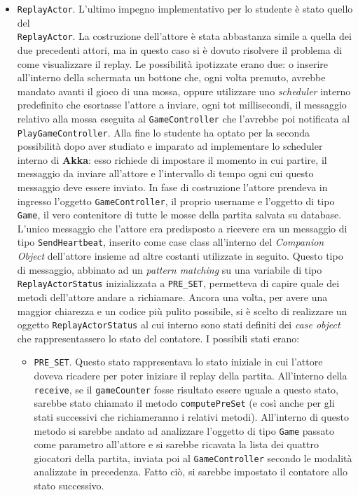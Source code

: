 \begin{itemize}
     \item \texttt{ReplayActor}.
     L'ultimo impegno implementativo per lo studente è stato quello del \\ \texttt{ReplayActor}. La costruzione dell'attore è stata abbastanza simile a quella dei due precedenti attori, ma in questo caso si è dovuto risolvere il problema di come visualizzare il replay. Le possibilità ipotizzate erano due: o inserire all'interno della schermata un bottone che, ogni volta premuto, avrebbe mandato avanti il gioco di una mossa, oppure utilizzare uno \textit{scheduler} interno predefinito che esortasse l'attore a inviare, ogni tot millisecondi, il messaggio relativo alla mossa eseguita al \texttt{GameController} che l'avrebbe poi notificata al \texttt{PlayGameController}. Alla fine lo studente ha optato per la seconda possibilità dopo aver studiato e imparato ad implementare lo scheduler interno di \textbf{Akka}: esso richiede di impostare il momento in cui partire, il messaggio da inviare all'attore e l'intervallo di tempo ogni cui questo messaggio deve essere inviato. In fase di costruzione l'attore prendeva in ingresso l'oggetto \texttt{GameController}, il proprio username e l'oggetto di tipo \texttt{Game}, il vero contenitore di tutte le mosse della partita salvata su database. L'unico messaggio che l'attore era predisposto a ricevere era un messaggio di tipo \texttt{SendHeartbeat}, inserito come case class all'interno del \textit{Companion Object} dell'attore insieme ad altre costanti utilizzate in seguito. Questo tipo di messaggio, abbinato ad un \textit{pattern matching} su una variabile di tipo \texttt{ReplayActorStatus} inizializzata a \texttt{PRE\_SET}, permetteva di capire quale dei metodi dell'attore andare a richiamare. Ancora una volta, per avere una maggior chiarezza e un codice più pulito possibile, si è scelto di realizzare un oggetto \texttt{ReplayActorStatus} al cui interno sono stati definiti dei \textit{case object} che rappresentassero lo stato del contatore. I possibili stati erano:

     \begin {itemize}

     \item \texttt{PRE\_SET}. Questo stato rappresentava lo stato iniziale in cui l'attore doveva ricadere per poter iniziare il replay della partita. All'interno della \texttt{receive}, se il \texttt{gameCounter} fosse risultato essere uguale a questo stato, sarebbe stato chiamato il metodo \texttt{computePreSet} (e così anche per gli stati successivi che richiameranno i relativi metodi). All'interno di questo metodo si sarebbe andato ad analizzare l'oggetto di tipo \texttt{Game} passato come parametro all'attore e si sarebbe ricavata la lista dei quattro giocatori della partita, inviata poi al \texttt{GameController} secondo le modalità analizzate in precedenza. Fatto ciò, si sarebbe impostato il contatore allo stato successivo.


\end{itemize}
\end{itemize}
